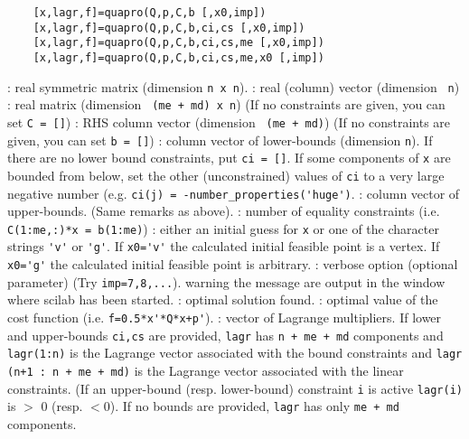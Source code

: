 
\begin{mandesc}
\end{mandesc}
\label{quapro}
\begin{calling_sequence}
  \begin{verbatim}
    [x,lagr,f]=quapro(Q,p,C,b [,x0,imp])  
    [x,lagr,f]=quapro(Q,p,C,b,ci,cs [,x0,imp])  
    [x,lagr,f]=quapro(Q,p,C,b,ci,cs,me [,x0,imp])  
    [x,lagr,f]=quapro(Q,p,C,b,ci,cs,me,x0 [,imp])  
  \end{verbatim}
\end{calling_sequence}
\begin{parameters}
  \begin{varlist}
     : real symmetric matrix (dimension \verb!n x n!).
     : real (column) vector (dimension \verb! n!)
     : real matrix (dimension \verb! (me + md) x n!) (If no constraints are given, you can set \verb!C = []!)
    : RHS column vector (dimension \verb! (me + md)!) (If no constraints are given, you can set \verb!b = []!)
    : column vector of lower-bounds (dimension \verb!n!). If there are no lower bound constraints, put \verb!ci = []!. If some components of \verb!x! are bounded from below, set the other (unconstrained) values of \verb!ci! to a very  large negative  number (e.g. \verb!ci(j) = -number_properties('huge')!.
    : column vector of upper-bounds. (Same remarks as above).
    : number of equality constraints (i.e. \verb!C(1:me,:)*x = b(1:me)!)
    : either an initial guess for \verb!x!    or one of the character strings \verb!'v'! or \verb!'g'!. If \verb!x0='v'! the calculated initial feasible point is a vertex. If \verb!x0='g'! the calculated initial feasible point is arbitrary.
    : verbose option (optional parameter)   (Try \verb!imp=7,8,...!). warning the message are output in the window where scilab has been started.
    : optimal solution found.
    : optimal value of the cost function (i.e. \verb!f=0.5*x'*Q*x+p'!).
    : vector of Lagrange multipliers.  If lower and upper-bounds \verb!ci,cs! are provided, \verb!lagr! has  \verb!n + me + md! components and \verb!lagr(1:n)! is the Lagrange  vector associated with the bound constraints and  \verb!lagr (n+1 : n + me + md)! is the Lagrange vector associated  with the linear constraints. (If an upper-bound (resp. lower-bound) constraint \verb!i! is active  \verb!lagr(i)! is $>$ 0 (resp. $<$0). If no bounds are provided, \verb!lagr! has only \verb!me + md! components.
  \end{varlist}

\end{parameters}

